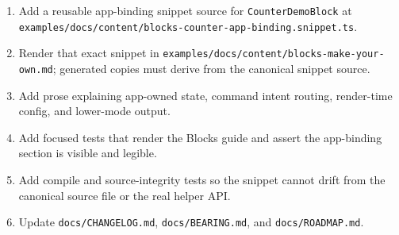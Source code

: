 \begin{enumerate}
\def\labelenumi{\arabic{enumi}.}
\tightlist
\item
  Add a reusable app-binding snippet source for \texttt{C\allowbreak{}o\allowbreak{}u\allowbreak{}n\allowbreak{}t\allowbreak{}e\allowbreak{}r\allowbreak{}D\allowbreak{}e\allowbreak{}m\allowbreak{}o\allowbreak{}B\allowbreak{}l\allowbreak{}o\allowbreak{}c\allowbreak{}k} at \texttt{e\allowbreak{}x\allowbreak{}a\allowbreak{}m\allowbreak{}p\allowbreak{}l\allowbreak{}e\allowbreak{}s\allowbreak{}/\allowbreak{}d\allowbreak{}o\allowbreak{}c\allowbreak{}s\allowbreak{}/\allowbreak{}c\allowbreak{}o\allowbreak{}n\allowbreak{}t\allowbreak{}e\allowbreak{}n\allowbreak{}t\allowbreak{}/\allowbreak{}b\allowbreak{}l\allowbreak{}o\allowbreak{}c\allowbreak{}k\allowbreak{}s\allowbreak{}-\allowbreak{}c\allowbreak{}o\allowbreak{}u\allowbreak{}n\allowbreak{}t\allowbreak{}e\allowbreak{}r\allowbreak{}-\allowbreak{}a\allowbreak{}p\allowbreak{}p\allowbreak{}-\allowbreak{}b\allowbreak{}i\allowbreak{}n\allowbreak{}d\allowbreak{}i\allowbreak{}n\allowbreak{}g\allowbreak{}.\allowbreak{}s\allowbreak{}n\allowbreak{}i\allowbreak{}p\allowbreak{}p\allowbreak{}e\allowbreak{}t\allowbreak{}.\allowbreak{}t\allowbreak{}s}.
\item
  Render that exact snippet in \texttt{e\allowbreak{}x\allowbreak{}a\allowbreak{}m\allowbreak{}p\allowbreak{}l\allowbreak{}e\allowbreak{}s\allowbreak{}/\allowbreak{}d\allowbreak{}o\allowbreak{}c\allowbreak{}s\allowbreak{}/\allowbreak{}c\allowbreak{}o\allowbreak{}n\allowbreak{}t\allowbreak{}e\allowbreak{}n\allowbreak{}t\allowbreak{}/\allowbreak{}b\allowbreak{}l\allowbreak{}o\allowbreak{}c\allowbreak{}k\allowbreak{}s\allowbreak{}-\allowbreak{}m\allowbreak{}a\allowbreak{}k\allowbreak{}e\allowbreak{}-\allowbreak{}y\allowbreak{}o\allowbreak{}u\allowbreak{}r\allowbreak{}-\allowbreak{}o\allowbreak{}w\allowbreak{}n\allowbreak{}.\allowbreak{}m\allowbreak{}d}; generated copies must derive from the canonical snippet source.
\item
  Add prose explaining app-owned state, command intent routing, render-time config, and lower-mode output.
\item
  Add focused tests that render the Blocks guide and assert the app-binding section is visible and legible.
\item
  Add compile and source-integrity tests so the snippet cannot drift from the canonical source file or the real helper API.
\item
  Update \texttt{d\allowbreak{}o\allowbreak{}c\allowbreak{}s\allowbreak{}/\allowbreak{}C\allowbreak{}H\allowbreak{}A\allowbreak{}N\allowbreak{}G\allowbreak{}E\allowbreak{}L\allowbreak{}O\allowbreak{}G\allowbreak{}.\allowbreak{}m\allowbreak{}d}, \texttt{d\allowbreak{}o\allowbreak{}c\allowbreak{}s\allowbreak{}/\allowbreak{}B\allowbreak{}E\allowbreak{}A\allowbreak{}R\allowbreak{}I\allowbreak{}N\allowbreak{}G\allowbreak{}.\allowbreak{}m\allowbreak{}d}, and \texttt{d\allowbreak{}o\allowbreak{}c\allowbreak{}s\allowbreak{}/\allowbreak{}R\allowbreak{}O\allowbreak{}A\allowbreak{}D\allowbreak{}M\allowbreak{}A\allowbreak{}P\allowbreak{}.\allowbreak{}m\allowbreak{}d}.
\end{enumerate}

